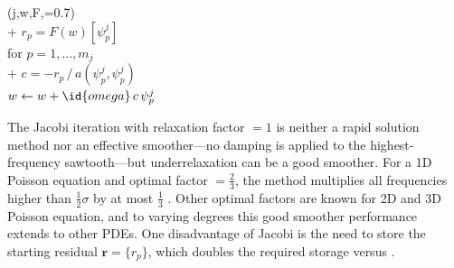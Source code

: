 \documentclass[letterpaper,final,12pt,reqno]{amsart}
\theoremstyle{claim}
\newcommand{\br}{\mathbf{r}}
\numberwithin{equation}{section}
\numberwithin{figure}{section}
\numberwithin{table}{section}
\numberwithin{theorem}{section}
\begin{document}
\begin{pseudo*} \label{ps:jacobi-sweep}
(j,w,F,=0.7)\text{:} \\+
    $r_p = F(w)[\psi_p^j]$ \qquad\qquad\qquad\qquad {} \\
    for $p=1,\dots,m_j$ \\+
        $\displaystyle c = - r_p \, \big/ \, a(\psi_p^j,\psi_p^j)$  \\
        $w \gets w + \id{omega} \,c \,\psi_p^j$
\end{pseudo*}

The Jacobi iteration with relaxation factor  $=1$ is neither a rapid solution method nor an effective smoother---no damping is applied to the highest-frequency sawtooth---but underrelaxation can be a good smoother.  For a 1D Poisson equation and optimal factor  $=\frac{2}{3}$, the method multiplies all frequencies higher than $\frac{1}{2} \sigma$ by at most $\frac{1}{3}$ \cite[Chapter 4]{Briggsetal2000}.  Other optimal factors are known for 2D and 3D Poisson equation, and to varying degrees this good smoother performance extends to other PDEs.  One disadvantage of Jacobi is the need to store the starting residual $\br = \{r_p\}$, which doubles the required storage versus .
\end{document}
